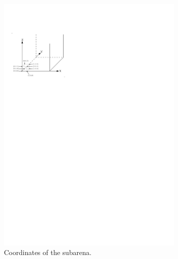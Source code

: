\begin{figure}
	\centering
	\begin{subfigure}[b]{0.5\textwidth}
		\centering
		\includegraphics[width=1.0\textwidth]{meetings/pics/coords.pdf}
		\caption{Coordinates of the subarena.}
		\label{fig:coords}
	\end{subfigure}%
	\begin{subfigure}[b]{0.4\textwidth}
		\centering

\end{subfigure}
\end{figure}

